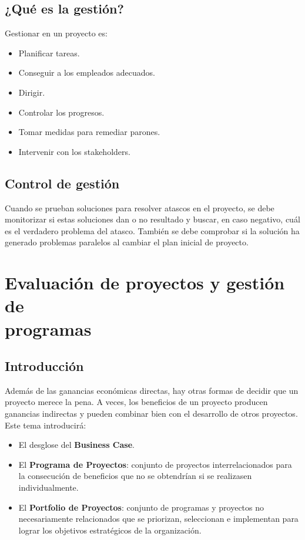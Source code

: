 \documentclass[12pt]{article}
\begin{document}
\subsection{¿Qué es la gestión?}
\label{1.13.0}

{Gestionar en un proyecto es:}

\begin{itemize}
    \item {Planificar tareas.}
    \item {Conseguir a los empleados adecuados.}
    \item {Dirigir.}
    \item {Controlar los progresos.}
    \item {Tomar medidas para remediar parones.}
    \item {Intervenir con los stakeholders.}
\end{itemize}

\subsection{Control de gestión}
\label{1.14.0}

{Cuando se prueban soluciones para resolver atascos en el proyecto, se debe monitorizar si estas soluciones dan o no resultado y buscar, en caso negativo, cuál es el verdadero problema del atasco. También se debe comprobar si la solución ha generado problemas paralelos al cambiar el plan inicial de proyecto.}

\newpage

\section[Evaluación de proyectos y gestión de programas]{Evaluación de proyectos y gestión de \\programas}
\label{2.0.0}
\subsection{Introducción}
\label{2.1.0}

{Además de las ganancias económicas directas, hay otras formas de decidir que un proyecto merece la pena. A veces, los beneficios de un proyecto producen ganancias indirectas y pueden combinar bien con el desarrollo de otros proyectos.}\\

{Este tema introducirá:}
\begin{itemize}
    \item {El desglose del \textbf{Business Case}.}
    \item {El \textbf{Programa de Proyectos}: conjunto de proyectos interrelacionados para la consecución de beneficios que no se obtendrían si se realizasen individualmente.}
    \item {El \textbf{Portfolio de Proyectos}: conjunto de programas y proyectos no necesariamente relacionados que se priorizan, seleccionan e implementan para lograr los objetivos estratégicos de la organización.}
\end{itemize}
\end{document}
